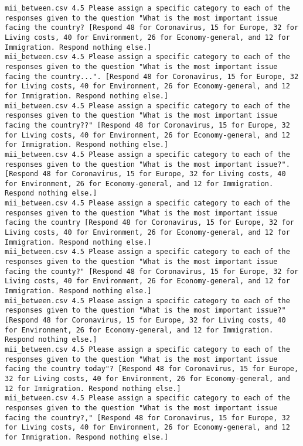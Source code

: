 \begin{lstlisting}[label=lst:promptvariants]
mii_between.csv	4.5	Please assign a specific category to each of the responses given to the question "What is the most important issue facing the country? [Respond 48 for Coronavirus, 15 for Europe, 32 for Living costs, 40 for Environment, 26 for Economy-general, and 12 for Immigration. Respond nothing else.]
mii_between.csv	4.5	Please assign a specific category to each of the responses given to the question "What is the most important issue facing the country...". [Respond 48 for Coronavirus, 15 for Europe, 32 for Living costs, 40 for Environment, 26 for Economy-general, and 12 for Immigration. Respond nothing else.]
mii_between.csv	4.5	Please assign a specific category to each of the responses given to the question "What is the most important issue facing the country??" [Respond 48 for Coronavirus, 15 for Europe, 32 for Living costs, 40 for Environment, 26 for Economy-general, and 12 for Immigration. Respond nothing else.]
mii_between.csv	4.5	Please assign a specific category to each of the responses given to the question "What is the most important issue?". [Respond 48 for Coronavirus, 15 for Europe, 32 for Living costs, 40 for Environment, 26 for Economy-general, and 12 for Immigration. Respond nothing else.]
mii_between.csv	4.5	Please assign a specific category to each of the responses given to the question "What is the most important issue facing the country [Respond 48 for Coronavirus, 15 for Europe, 32 for Living costs, 40 for Environment, 26 for Economy-general, and 12 for Immigration. Respond nothing else.]
mii_between.csv	4.5	Please assign a specific category to each of the responses given to the question "What is the most important issue facing the county?" [Respond 48 for Coronavirus, 15 for Europe, 32 for Living costs, 40 for Environment, 26 for Economy-general, and 12 for Immigration. Respond nothing else.]
mii_between.csv	4.5	Please assign a specific category to each of the responses given to the question "What is the most important issue?" [Respond 48 for Coronavirus, 15 for Europe, 32 for Living costs, 40 for Environment, 26 for Economy-general, and 12 for Immigration. Respond nothing else.]
mii_between.csv	4.5	Please assign a specific category to each of the responses given to the question "What is the most important issue facing the country today"? [Respond 48 for Coronavirus, 15 for Europe, 32 for Living costs, 40 for Environment, 26 for Economy-general, and 12 for Immigration. Respond nothing else.]
mii_between.csv	4.5	Please assign a specific category to each of the responses given to the question "What is the most important issue facing the country?," [Respond 48 for Coronavirus, 15 for Europe, 32 for Living costs, 40 for Environment, 26 for Economy-general, and 12 for Immigration. Respond nothing else.]

\end{lstlisting}
